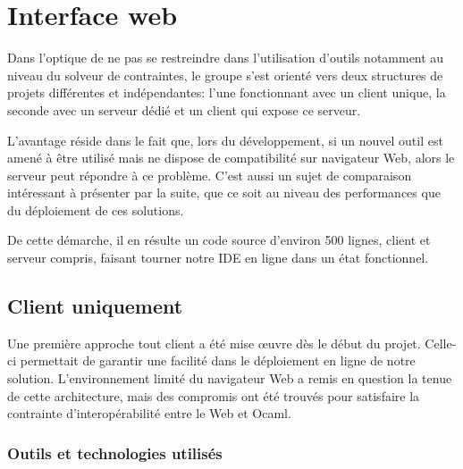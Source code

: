 \documentclass[
  12pt,
]{article}
\begin{document}
\newpage

\hypertarget{interface-web}{%
  \section{Interface web}\label{interface-web}}

Dans l'optique de ne pas se restreindre dans l'utilisation d'outils
notamment au niveau du solveur de contraintes, le groupe s'est orienté
vers deux structures de projets différentes et indépendantes: l'une
fonctionnant avec un client unique, la seconde avec un serveur dédié et
un client qui expose ce serveur.

L'avantage réside dans le fait que, lors du développement, si un nouvel
outil est amené à être utilisé mais ne dispose de compatibilité sur
navigateur Web, alors le serveur peut répondre à ce problème. C'est
aussi un sujet de comparaison intéressant à présenter par la suite, que
ce soit au niveau des performances que du déploiement de ces solutions.

De cette démarche, il en résulte un code source d'environ 500 lignes,
client et serveur compris, faisant tourner notre IDE en ligne dans un
état fonctionnel.

\hypertarget{client-uniquement}{%
  \subsection{Client uniquement}\label{client-uniquement}}

Une première approche tout client a été mise œuvre dès le début du
projet. Celle-ci permettait de garantir une facilité dans le déploiement
en ligne de notre solution. L'environnement limité du navigateur Web a
remis en question la tenue de cette architecture, mais des compromis ont
été trouvés pour satisfaire la contrainte d'interopérabilité entre le
Web et Ocaml.

\hypertarget{outils-et-technologies-utilisuxe9s}{%
  \subsubsection{Outils et technologies
    utilisés}\label{outils-et-technologies-utilisuxe9s}}
\end{document}
